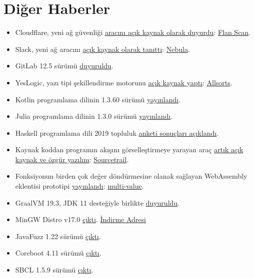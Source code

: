 \documentclass[11pt]{article}
\begin{document}
\section{Diğer Haberler}
\label{sec:org65a8d05}
\begin{itemize}
\item Cloudflare, yeni ağ güvenliği \href{https://blog.cloudflare.com/introducing-flan-scan/}{aracını açık kaynak olarak duyurdu}: \href{https://github.com/cloudflare/flan}{Flan Scan}.
\item Slack, yeni ağ aracını \href{https://slack.engineering/introducing-nebula-the-open-source-global-overlay-network-from-slack-884110a5579}{açık kaynak olarak tanıttı}: \href{https://github.com/slackhq/nebula}{Nebula}.
\item GitLab 12.5 sürümü \href{https://about.gitlab.com/blog/2019/11/22/gitlab-12-5-released/}{duyuruldu}.
\item YesLogic, yazı tipi şekillendirme motorunu \href{https://yeslogic.com/blog/allsorts-rust-font-shaping-engine.html}{açık kaynak yaptı}: \href{https://github.com/yeslogic/allsorts}{Allsorts}.
\item Kotlin programlama dilinin 1.3.60 sürümü \href{https://blog.jetbrains.com/kotlin/2019/11/kotlin-1-3-60-released/}{yayınlandı}.
\item Julia programlama dilinin 1.3.0 sürümü \href{https://github.com/JuliaLang/julia/releases/tag/v1.3.0}{yayınlandı}.
\item Haskell programlama dili 2019 topluluk \href{https://taylor.fausak.me/2019/11/16/haskell-survey-results/}{anketi sonuçları açıklandı}.
\item Kaynak koddan programın akışını görselleştirmeye yarayan araç \href{https://www.sourcetrail.com/blog/open\_source/}{artık açık
kaynak ve özgür yazılım}: \href{https://github.com/CoatiSoftware/Sourcetrail}{Sourcetrail}.
\item Fonksiyonun birden çok değer döndürmesine olanak sağlayan WebAssembly
eklentisi prototipi \href{https://hacks.mozilla.org/2019/11/multi-value-all-the-wasm/}{yayınlandı}: \href{https://github.com/WebAssembly/multi-value}{multi-value}.
\item GraalVM 19.3, JDK 11 desteğiyle birlikte \href{https://medium.com/graalvm/graalvm-19-3-0-dfdb6f4ec8ed}{duyuruldu}.
\item MinGW Distro v17.0 \href{https://github.com/StephanTLavavej/mingw-distro/releases/tag/v17.0}{çıktı}. \href{https://nuwen.net/mingw.html}{İndirme Adresi}
\item JavaFuzz 1.22 sürümü \href{https://github.com/fuzzitdev/javafuzz/releases/tag/javafuzz-1.22}{çıktı}.
\item Coreboot 4.11 sürümü \href{https://blogs.coreboot.org/blog/2019/11/19/announcing-coreboot-4-11/}{çıktı}.
\item SBCL 1.5.9 sürümü \href{http://www.sbcl.org/all-news.html\#1.5.9}{çıktı}.
\end{itemize}
\end{document}
